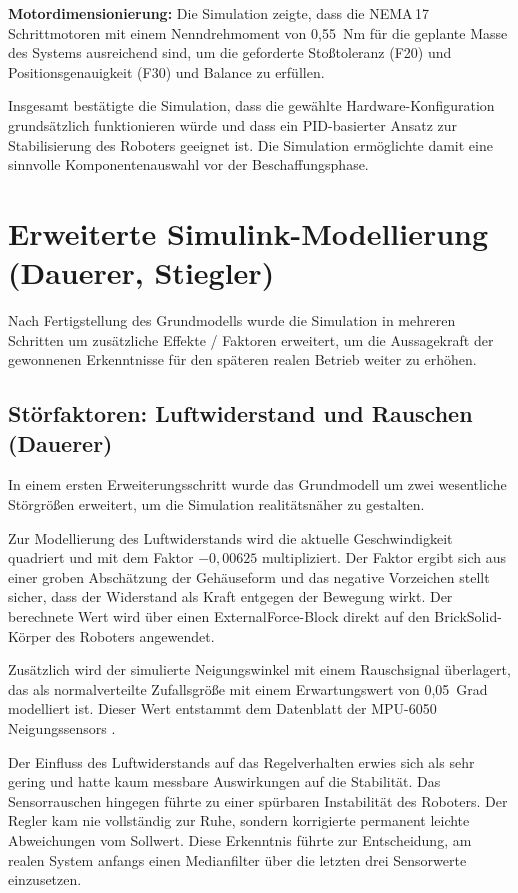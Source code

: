 \documentclass[fontsize=12pt,
parskip=half,	%
department=FakM,  %
logostyle=flat,
twoside, %
DIV=15,BCOR=10mm, %
]{OTHRreprt}
\begin{document}
\textbf{Motordimensionierung:} Die Simulation zeigte, dass die NEMA\,17 Schrittmotoren mit einem Nenndrehmoment von 0,55~Nm \cite{Nema17HS151504S1_Full_Datasheet} für die geplante Masse des Systems ausreichend sind, um die geforderte Stoßtoleranz (F20) und Positionsgenauigkeit (F30) und Balance zu erfüllen.

Insgesamt bestätigte die Simulation, dass die gewählte Hardware-Konfiguration grundsätzlich funktionieren würde und dass ein PID-basierter Ansatz zur Stabilisierung des Roboters geeignet ist. Die Simulation ermöglichte damit eine sinnvolle Kom\-po\-nen\-ten\-aus\-wahl vor der Be\-schaf\-fungs\-pha\-se.

\section{Erweiterte Simulink-Modellierung (Dauerer, Stiegler)}
\label{sec:simulink_erweitert}

Nach Fertigstellung des Grundmodells wurde die Simulation in mehreren Schritten um zusätzliche Effekte / Faktoren erweitert, um die Aussagekraft der gewonnenen Erkenntnisse für den späteren realen Betrieb weiter zu erhöhen.

\subsection{Störfaktoren: Luftwiderstand und Rauschen (Dauerer)}
\label{subsec:simulink_rauschen}

In einem ersten Erweiterungsschritt wurde das Grundmodell um zwei wesentliche Störgrößen erweitert, um die Simulation realitätsnäher zu gestalten.

Zur Modellierung des Luftwiderstands wird die aktuelle Geschwindigkeit quadriert und mit dem Faktor $-0{,}00625$ multipliziert. Der Faktor ergibt sich aus einer groben Abschätzung der Gehäuseform und das negative Vorzeichen stellt sicher, dass der Widerstand als Kraft entgegen der Bewegung wirkt. Der berechnete Wert wird über einen ExternalForce-Block direkt auf den BrickSolid-Körper des Roboters angewendet.

Zusätzlich wird der simulierte Neigungswinkel mit einem Rauschsignal überlagert, das als normalverteilte Zufallsgröße mit einem Erwartungswert von 0,05~Grad modelliert ist. Dieser Wert entstammt dem Datenblatt der MPU-6050 Neigungssensors \cite{az-deliveryGY521}.

Der Einfluss des Luftwiderstands auf das Regelverhalten erwies sich als sehr gering und hatte kaum messbare Auswirkungen auf die Stabilität. Das Sensorrauschen hingegen führte zu einer spürbaren Instabilität des Roboters. Der Regler kam nie vollständig zur Ruhe, sondern korrigierte permanent leichte Abweichungen vom Sollwert. Diese Erkenntnis führte zur Entscheidung, am realen System anfangs einen Medianfilter über die letzten drei Sensorwerte einzusetzen.
\end{document}

